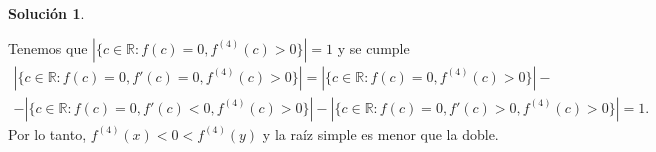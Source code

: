 \documentclass[10pt]{article}
\theoremstyle{definition}
\newtheorem*{sol}{Solución}
\newcommand{\RR}{\mathbb{R}}
\begin{document}
\begin{sol}
\begin{itemize}
    Tenemos que $|\{c\in\RR: f(c)=0,f^{(4)}(c)>0\}|=1$ y se cumple
    \begin{multline*}
        |\{c\in\RR: f(c)=0,f'(c)=0,f^{(4)}(c)>0\}| = |\{c\in\RR: f(c)=0,f^{(4)}(c)>0\}|-\\-|\{c\in\RR: f(c)=0,f'(c)<0,f^{(4)}(c)>0\}|-|\{c\in\RR:f(c)=0,f'(c)>0,f^{(4)}(c)>0\}|=1.
    \end{multline*}
    Por lo tanto, $f^{(4)}(x)<0<f^{(4)}(y)$ y la raíz simple es menor que la doble.
    
\end{itemize}
\end{sol}
\end{document}
